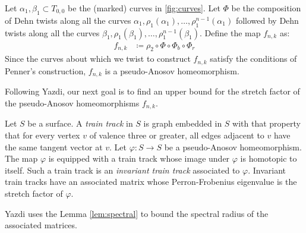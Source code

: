 Let $\alpha_1,\beta_1 \subset T_{0,0}$ be the (marked) curves in \autoref{fig:curves}. Let $\Phi$ be the composition
of Dehn twists along all the curves $\alpha_1, \rho_1(\alpha_1), \dots, \rho_1^{n-1}(\alpha_1)$ followed by
Dehn twists along all the curves $\beta_1,\rho_1(\beta_1),\dots,\rho_1^{n-1}(\beta_1)$. Define the map $f_{n,k}$
as:
\begin{align*}
    f_{n,k} &\coloneqq \rho_2 \circ \Phi \circ \Phi_b \circ \Phi_r
\end{align*}
Since the curves about which we twist to construct $f_{n,k}$ satisfy the conditions of Penner's construction, $f_{n,k}$ is a pseudo-Anosov homeomorphism.%

Following Yazdi, our next goal is to find an upper bound for the stretch factor of the pseudo-Anosov homeomorphisms $f_{n,k}$.

 Let $S$ be a surface.  A \textit{train track} in $S$ is graph embedded in $S$ with that property that for every vertex $v$ of valence three or greater, all edges adjacent to $v$ have the same tangent vector at $v$. Let $\varphi:S\rightarrow S$ be a pseudo-Anosov homeomorphism.  The map $\varphi$ is equipped with a train track whose image under $\varphi$ is homotopic to itself.  Such a train track is an \textit{invariant train track} associated to $\varphi$. Invariant train tracks have an associated matrix whose Perron-Frobenius eigenvalue is the stretch factor of $\varphi$.


Yazdi uses the Lemma \ref{lem:spectral} to bound the spectral radius of the associated matrices.


